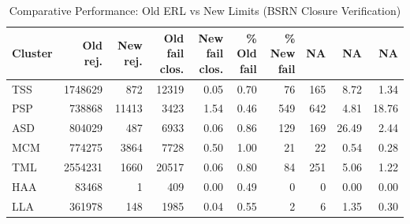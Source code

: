 \begin{table}[ht]
\centering
\begin{tabular}{lrrrrrrrrr}
  \hline
Cluster & Old rej. & New rej. & Old fail clos. & New fail clos. & \% Old fail & \% New fail & NA & NA & NA \\ 
  \hline
TSS & 1748629 & 872 & 12319 & 0.05 & 0.70 & 76 & 165 & 8.72 & 1.34 \\ 
  PSP & 738868 & 11413 & 3423 & 1.54 & 0.46 & 549 & 642 & 4.81 & 18.76 \\ 
  ASD & 804029 & 487 & 6933 & 0.06 & 0.86 & 129 & 169 & 26.49 & 2.44 \\ 
  MCM & 774275 & 3864 & 7728 & 0.50 & 1.00 & 21 & 22 & 0.54 & 0.28 \\ 
  TML & 2554231 & 1660 & 20517 & 0.06 & 0.80 & 84 & 251 & 5.06 & 1.22 \\ 
  HAA & 83468 & 1 & 409 & 0.00 & 0.49 & 0 & 0 & 0.00 & 0.00 \\ 
  LLA & 361978 & 148 & 1985 & 0.04 & 0.55 & 2 & 6 & 1.35 & 0.30 \\ 
   \hline
\end{tabular}
\caption{Comparative Performance: Old ERL vs New Limits (BSRN Closure Verification)} 
\label{tab:qc_comparison}
\end{table}

